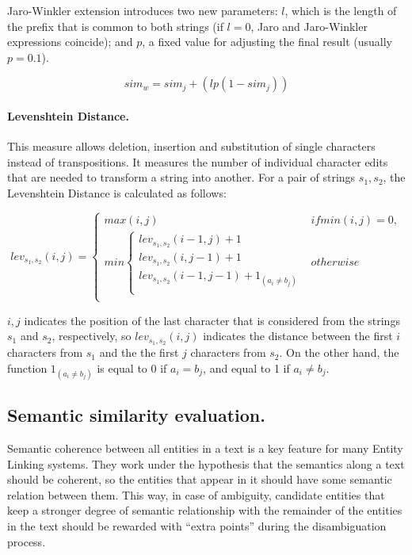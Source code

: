 Jaro-Winkler extension introduces two new parameters: $l$, which is the length of the prefix that is common to both strings (if $l=0$, Jaro and Jaro-Winkler expressions coincide); and $p$, a fixed value for adjusting the final result (usually $p=0.1$).

\begin{equation}
sim_w = sim_j + (lp(1-sim_j))
\label{eq:jaroWinkler}
\end{equation}

\paragraph{Levenshtein Distance.}

This measure allows deletion, insertion and substitution of single characters instead of transpositions. It measures the number of individual character edits that are needed to transform a string into another. For a pair of strings $s_1,s_2$, the Levenshtein Distance is calculated as follows:

\begin{equation}
lev_{s_1,s_2}(i,j) = \begin{cases}
max(i,j) & if min(i,j)=0, \\
min\begin{cases}
	lev_{s_1,s_2}(i-1,j)+1 \\
	lev_{s_1,s_2}(i,j-1)+1 \\
	lev_{s_1,s_2}(i-1,j-1)+1_{(a_i \neq b_j)} \\
\end{cases}
& otherwise\\
\end{cases}
\label{eq:levenshtein}
\end{equation}

$i,j$ indicates the position of the last character that is considered from the strings $s_1$ and $s_2$, respectively, so $lev_{s_1,s_2}(i,j)$ indicates the distance between the first $i$ characters from $s_1$ and the the first $j$ characters from $s_2$. On the other hand, the function $1_{(a_i \neq b_j)}$ is equal to 0 if $a_i = b_j$, and equal to 1 if $a_i \neq b_j$.



\subsection{Semantic similarity evaluation.}
\label{sec:techniques:semantic}

Semantic coherence between all entities in a text is a key feature for many Entity Linking systems. They work under the hypothesis that the semantics along a text should be coherent, so the entities that appear in it should have some semantic relation between them. This way, in case of ambiguity, candidate entities that keep a stronger degree of semantic relationship with the remainder of the entities in the text should be rewarded with ``extra points'' during the disambiguation process.

